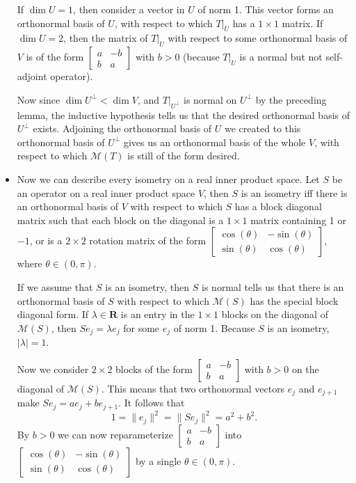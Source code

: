 \documentclass[11pt]{article}
\newcommand{\R}{\mathbf{R}}
\renewcommand{\d}{\dim}
\newcommand{\nm}[1]{\|#1\|}
\newcommand{\abs}[1]{\lvert #1 \rvert}
\newcommand{\M}{\mathcal{M}}
\begin{document}
\begin{itemize}
    If $\d U = 1$, then consider a vector in $U$ of norm 1. This vector forms an orthonormal basis of $U$, with respect to which $T|_U$ has a $1\times1$ matrix. If $\d U = 2$, then the matrix of $T|_U$ with respect to some orthonormal basis of $V$ is of the form $\begin{bmatrix}
    a & -b \\ b & a
    \end{bmatrix}$ with $b>0$ (because $T|_U$ is a normal but not self-adjoint operator).
    
    Now since $\d U^\perp < \d V$, and $T|_{U^\perp}$ is normal on $U^\perp$ by the preceding lemma, the inductive hypothesis tells us that the desired orthonormal basis of $U^\perp$ exists. Adjoining the orthonormal basis of $U$ we created to this orthonormal basis of $U^\perp$ gives us an orthonormal basis of the whole $V$, with respect to which $\M(T)$ is still of the form desired.
    \item Now we can describe every isometry on a real inner product space. Let $S$ be an operator on a real inner product space $V$, then $S$ is an isometry iff there is an orthonormal basis of $V$ with respect to which $S$ has a block diagonal matrix such that each block on the diagonal is a $1\times1$ matrix containing 1 or $-1$, or is a $2\times2$ rotation matrix of the form $\begin{bmatrix}
    \cos(\theta) & -\sin(\theta) \\ \sin(\theta) & \cos(\theta)
    \end{bmatrix}$, where $\theta \in (0,\pi)$.

    If we assume that $S$ is an isometry, then $S$ is normal tells us that there is an orthonormal basis of $S$ with respect to which $\M(S)$ has the special block diagonal form. If $\lambda \in \R$ is an entry in the $1\times1$ blocks on the diagonal of $\M(S)$, then $Se_j = \lambda e_j$ for some $e_j$ of norm 1. Because $S$ is an isometry, $\abs{\lambda} = 1$.

    Now we consider $2\times2$ blocks of the form $\begin{bmatrix}
    a & -b \\ b & a
    \end{bmatrix}$ with $b>0$ on the diagonal of $\M(S)$. This means that two orthonormal vectors $e_j$ and $e_{j+1}$ make $Se_j = ae_j + be_{j+1}$. It follows that \[1 = \nm{e_j}^2 = \nm{Se_j}^2 = a^2 + b^2.\] By $b > 0$ we can now reparameterize $\begin{bmatrix}
    a & -b \\ b & a
    \end{bmatrix}$ into $\begin{bmatrix}
    \cos(\theta) & -\sin(\theta) \\ \sin(\theta) & \cos(\theta)
    \end{bmatrix}$ by a single $\theta \in (0,\pi)$.


\end{itemize}
\end{document}
